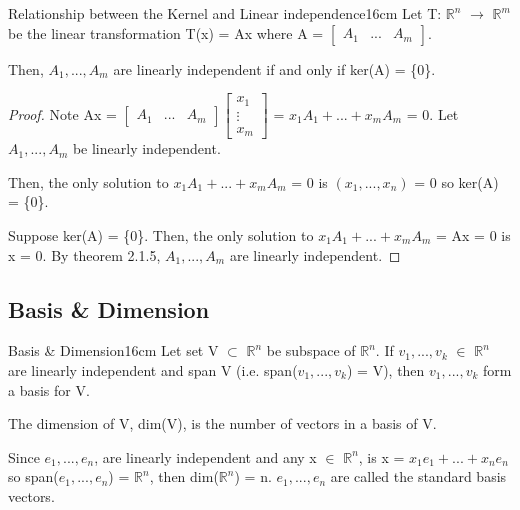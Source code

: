     \newpage



    \begin{wtheorem}{Relationship between the Kernel and Linear independence}{16cm}
        Let T: $\mathbb{R}^n$ $\rightarrow$ $\mathbb{R}^m$
        be the linear transformation T(x) = Ax where A =
        $\begin{bmatrix}
            A_1 & ... & A_m
        \end{bmatrix}$.

        Then, $A_1,...,A_m$ are linearly independent if and only if
        ker(A) = \{0\}.
    \end{wtheorem}

    \begin{proof}
        Note 
        Ax =
        \footnotesize
        $\begin{bmatrix}
            A_1 & ... & A_m
        \end{bmatrix}
        \begin{bmatrix}
            x_1 \\
            \vdots \\
            x_m
        \end{bmatrix}$
        \normalsize
        = $x_1A_1 + ... + x_mA_m$
        = 0.
        Let $A_1,...,A_m$ be linearly independent.

        Then, the only solution to $x_1A_1 + ... + x_mA_m$ = 0
        is $(x_1,...,x_n)$ = 0 so ker(A) = \{0\}.

        \vspace{0.2cm}

        Suppose ker(A) = \{0\}.
        Then, the only solution
        to $x_1A_1 + ... + x_mA_m$ = Ax = 0 is x = 0.
        By {\color{red} theorem 2.1.5},
        $A_1,...,A_m$ are linearly independent.
    \end{proof}





\subsection{ Basis \& Dimension }

    \begin{definition}{Basis \& Dimension}{16cm}
        Let set V $\subset$ $\mathbb{R}^n$ be subspace of $\mathbb{R}^n$.
        If $v_1,...,v_k$ $\in$ $\mathbb{R}^n$ are linearly independent and span V
        (i.e. span($v_1,...,v_k$) = V), then $v_1,...,v_k$ form
        a {\color{lblue} basis} for V.

        The {\color{lblue} dimension} of V, dim(V), is the number of vectors in
        a basis of V.

        Since $e_1,...,e_n$, are linearly independent
        and any x $\in$ $\mathbb{R}^n$, is x = $x_1e_1 + ... + x_ne_n$
        so span($e_1,...,e_n$) = $\mathbb{R}^n$, then dim($\mathbb{R}^n$) = n.
        $e_1,...,e_n$ are called the {\color{lblue} standard basis vectors}.
    \end{definition}

